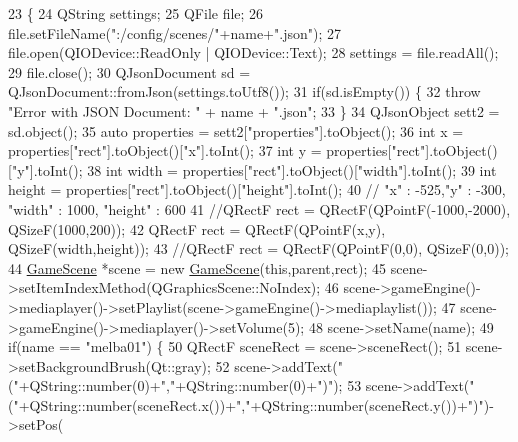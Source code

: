 \begin{DoxyCode}
23                                                                         \{
24     QString settings;
25     QFile file;
26     file.setFileName(\textcolor{stringliteral}{":/config/scenes/"}+name+\textcolor{stringliteral}{".json"});
27     file.open(QIODevice::ReadOnly | QIODevice::Text);
28     settings = file.readAll();
29     file.close();
30     QJsonDocument sd = QJsonDocument::fromJson(settings.toUtf8());
31     \textcolor{keywordflow}{if}(sd.isEmpty()) \{
32         \textcolor{keywordflow}{throw} \textcolor{stringliteral}{"Error with JSON Document: "} + name + \textcolor{stringliteral}{".json"};
33     \}
34     QJsonObject sett2 = sd.object();
35     \textcolor{keyword}{auto} properties = sett2[\textcolor{stringliteral}{"properties"}].toObject();
36     \textcolor{keywordtype}{int} x = properties[\textcolor{stringliteral}{"rect"}].toObject()[\textcolor{stringliteral}{"x"}].toInt();
37     \textcolor{keywordtype}{int} y = properties[\textcolor{stringliteral}{"rect"}].toObject()[\textcolor{stringliteral}{"y"}].toInt();
38     \textcolor{keywordtype}{int} width = properties[\textcolor{stringliteral}{"rect"}].toObject()[\textcolor{stringliteral}{"width"}].toInt();
39     \textcolor{keywordtype}{int} height = properties[\textcolor{stringliteral}{"rect"}].toObject()[\textcolor{stringliteral}{"height"}].toInt();
40     \textcolor{comment}{// "x" : -525,"y" : -300, "width" : 1000, "height" : 600}
41     \textcolor{comment}{//QRectF rect = QRectF(QPointF(-1000,-2000), QSizeF(1000,200));}
42     QRectF rect = QRectF(QPointF(x,y), QSizeF(width,height));
43     \textcolor{comment}{//QRectF rect = QRectF(QPointF(0,0), QSizeF(0,0));}
44     \hyperlink{class_game_scene}{GameScene} *scene = \textcolor{keyword}{new} \hyperlink{class_game_scene}{GameScene}(\textcolor{keyword}{this},parent,rect);
45     scene->setItemIndexMethod(QGraphicsScene::NoIndex);
46     scene->gameEngine()->mediaplayer()->setPlaylist(scene->gameEngine()->mediaplaylist());
47     scene->gameEngine()->mediaplayer()->setVolume(5);
48     scene->setName(name);
49     \textcolor{keywordflow}{if}(name == \textcolor{stringliteral}{"melba01"}) \{
50         QRectF sceneRect = scene->sceneRect();
51         scene->setBackgroundBrush(Qt::gray);
52         scene->addText(\textcolor{stringliteral}{"("}+QString::number(0)+\textcolor{stringliteral}{","}+QString::number(0)+\textcolor{stringliteral}{")"});
53         scene->addText(\textcolor{stringliteral}{"("}+QString::number(sceneRect.x())+\textcolor{stringliteral}{","}+QString::number(sceneRect.y())+\textcolor{stringliteral}{")"})->setPos(

\end{DoxyCode}
